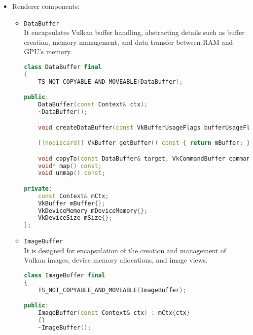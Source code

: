 \begin{itemize}
\begin{lstlisting}[language=c++, caption=\texttt{Renderer} class (./engine/src/core/renderer.h)]
    const Context& mCtx;
    const Headset& mHeadset;
    VkCommandPool mCommandPool{};
    VkDescriptorPool mDescriptorPool{};
    VkDescriptorSetLayout mDescriptorSetLayout{};
    VkPipelineLayout mPipelineLayout{};
    std::array<std::unique_ptr<RenderProcess>, framesInFlightCount> mRenderProcesses{};
    std::shared_ptr<Pipeline> mGridPipeline, mNormalLightingPipeline, mPbrPipeline, mLightCubePipeline;
    size_t mIndexOffset{};
    std::unique_ptr<DataBuffer> mVertexIndexBuffer;
    size_t mCurrentRenderProcessIndex{};
};
\end{lstlisting}
    \item Renderer components:
    \begin{itemize}
    \item \texttt{DataBuffer}\\
    It encapsulates Vulkan buffer handling, abstracting details such as buffer creation, memory management, and data transfer between RAM and GPU's memory.
\begin{lstlisting}[language=c++, caption=\texttt{DataBuffer} class (./engine/src/core/data\_buffer.h)]
class DataBuffer final
{
    TS_NOT_COPYABLE_AND_MOVEABLE(DataBuffer);

public:
    DataBuffer(const Context& ctx);
    ~DataBuffer();

    void createDataBuffer(const VkBufferUsageFlags bufferUsageFlags, const VkMemoryPropertyFlags memoryProperties, const VkDeviceSize size);

    [[nodiscard]] VkBuffer getBuffer() const { return mBuffer; }

    void copyTo(const DataBuffer& target, VkCommandBuffer commandBuffer, VkQueue queue) const;
    void* map() const;
    void unmap() const;

private:
    const Context& mCtx;
    VkBuffer mBuffer{};
    VkDeviceMemory mDeviceMemory{};
    VkDeviceSize mSize{};
};
\end{lstlisting}
    \item \texttt{ImageBuffer}\\
    It is designed for encapsulation of the creation and management of Vulkan images, device memory allocations, and image views.
\begin{lstlisting}[language=c++, caption=\texttt{ImageBuffer} class (./engine/src/core/image\_buffer.h)]
class ImageBuffer final
{
    TS_NOT_COPYABLE_AND_MOVEABLE(ImageBuffer);

public:
    ImageBuffer(const Context& ctx) : mCtx{ctx}
    {}
    ~ImageBuffer();


\end{lstlisting}
\end{itemize}
\end{itemize}

